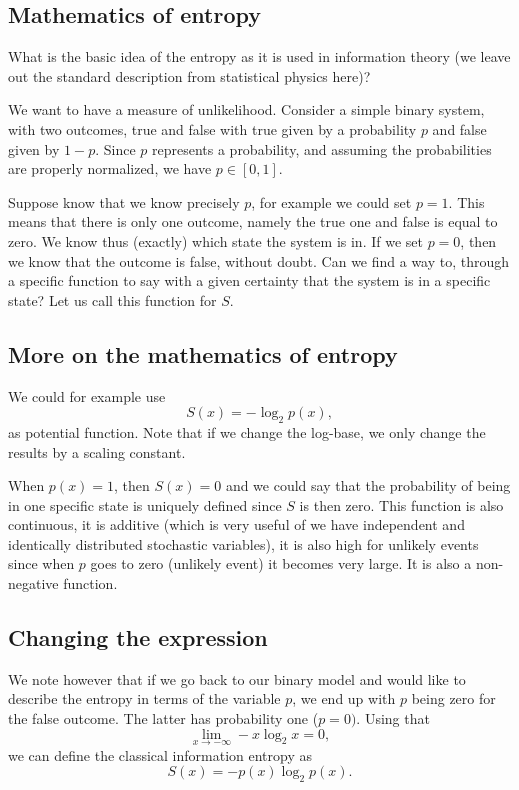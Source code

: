 \documentclass[%
oneside,                 %
final,                   %
10pt]{article}
\begin{document}
\subsection{Mathematics of entropy}

What is the basic idea of the entropy as it is used in information
theory (we leave out the standard description from statistical physics
here)?

We want to have a measure of unlikelihood. Consider a simple binary
system, with two outcomes, true and false with true given by a
probability $p$ and false given by $1-p$. Since $p$ represents a
probability, and assuming the probabilities are properly normalized,
we have $p\in [0,1]$.

Suppose know that we know precisely $p$, for example we could set
$p=1$. This means that there is only one outcome, namely the true one
and false is equal to zero. We know thus (exactly) which state the
system is in.  If we set $p=0$, then we know that the outcome is
false, without doubt.  Can we find a way to, through a specific
function to say with a given certainty that the system is in a
specific state? Let us call this function for $S$.

\subsection{More on the mathematics of entropy}

We could for example use
\[
S(x)= -\log_2{p(x)},
\]
as potential
function. Note that if we change the log-base, we only change the results by a scaling constant.

When $p(x)=1$, then $S(x)=0$ and we could say that the
probability of being in one specific state is uniquely defined since
$S$ is then zero.  This function is also continuous, it is additive
(which is very useful of we have independent and identically
distributed stochastic variables), it is also high for unlikely events
since when $p$ goes to zero (unlikely event) it becomes very
large. It is also a non-negative function.

\subsection{Changing the expression}

We note however that if we go back to our binary model and would like to
describe the entropy in terms of the variable $p$, we end up with $p$ being zero for the false outcome.
The latter has probability one ($p=0)$.
Using that
\[
\lim_{x\to -\infty} -x \log_2{x}=0,
\]
we can define the classical information entropy as
\[
S(x) = -p(x) \log_2{p(x)}.
\]
\end{document}
